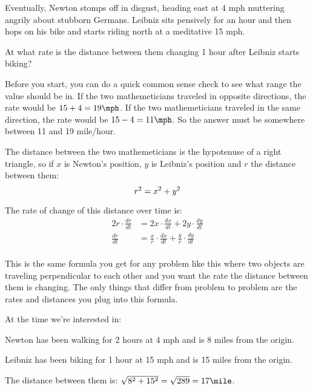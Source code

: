 \documentclass[fleqn,addpoints]{exam}
\begin{document}
\begin{questions}
Eventually, Newton stomps off in disgust, heading east at 4 mph muttering angrily about stubborn Germans.  Leibniz sits
pensively for an hour and then hops on his bike and starts riding north at a meditative 15 mph.

At what rate is the distance between them changing 1 hour after Leibniz starts biking?

\begin{solution}[11 cm]
Before you start, you can do a quick common sense check to see what range the value should be in.  If the two mathemeticians
traveled in opposite directions, the rate would be $15 + 4 = 19 \mph$.  If the two mathemeticians
traveled in the same direction, the rate would be $15 - 4 = 11 \mph$.  So the answer must be somewhere between
11 and 19 mile/hour.

The distance between the two mathemeticians is the hypotenuse of a right triangle, so if $x$ is Newton's position, $y$
is Leibniz's position and $r$ the distance between them:
\[
  r^2 = x^2 + y^2 \\
\]

The rate of change of this distance over time is:
\begin{align*}
  2r \cdot \frac{dr}{dt} &= 2x \cdot \frac{dx}{dt} + 2y \cdot \frac{dy}{dt} \\
  \frac{dr}{dt} &= \frac{x}{r} \cdot \frac{dx}{dt} + \frac{y}{r} \cdot \frac{dy}{dt} \\
\end{align*}

This is the same formula you get for any problem like this where two objects are traveling perpendicular to each other
and you want the rate the distance between them is changing.  The only things that differ from problem to problem are
the rates and distances you plug into this formula.

At the time we're interested in:
\begin{itemize*}
\item Newton has been walking for 2 hours at 4 mph and is 8 miles from the origin.
\item Leibniz has been biking for 1 hour at 15 mph and is 15 miles from the origin.
\item The distance between them is: $\sqrt{8^2 + 15^2} = \sqrt{289} = 17 \mile$.
\end{itemize*}


\end{solution}
\end{questions}
\end{document}
